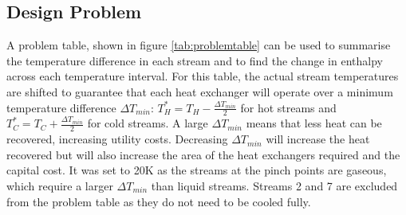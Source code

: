 \subsection{Design Problem}

A problem table, shown in figure \ref{tab:problemtable} can be used to summarise the temperature difference in each stream and to find the change in enthalpy across each temperature interval. For this table, the actual stream temperatures are shifted to guarantee that each heat exchanger will operate over a minimum temperature difference $\Delta T_{min}$: $T_H^* = T_H - \frac{\Delta T_{min}}{2}$ for hot streams and $T_C^* = T_C + \frac{\Delta T_{min}}{2}$ for cold streams. A large $\Delta T_{min}$ means that less heat can be recovered, increasing utility costs. Decreasing $\Delta T_{min}$ will increase the heat recovered but will also increase the area of the heat exchangers required and the capital cost. It was set to 20K as the streams at the pinch points are gaseous, which require a larger $\Delta T_{min}$ than liquid streams. Streams 2 and 7 are excluded from the problem table as they do not need to be cooled fully.

